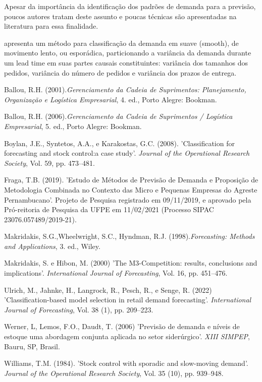 \documentclass[11pt,letterpaper,twocolumn]{article}
\begin{document}
Apesar da importância da identificação dos padrões de demanda para a previsão, poucos autores tratam deste assunto e poucas técnicas são apresentadas na literatura para essa finalidade.

\cite{Williams1984} apresenta um método para classificação da demanda em suave (smooth), de movimento lento, ou esporádica, particionando a variância da demanda durante um lead time em suas partes causais constituintes: variância dos tamanhos dos pedidos, variância do número de pedidos e variância dos prazos de entrega.

\begin{thebibliography}{9}

Ballou, R.H. (2001).{\it Gerenciamento da Cadeia de Suprimentos: Planejamento, Organização e Logística Empresarial}, 4. ed., Porto Alegre: Bookman.

Ballou, R.H. (2006).{\it Gerenciamento da Cadeia de Suprimentos / Logística Empresarial}, 5. ed., Porto Alegre: Bookman.

Boylan, J.E., Syntetos, A.A., e Karakostas, G.C. (2008). 'Classification for forecasting and stock control:a case study'. {\it Journal of the Operational Research Society}, Vol. 59, pp. 473--481.

Fraga, T.B. (2019). 'Estudo de Métodos de Previsão de Demanda e Proposição de Metodologia Combinada no Contexto das Micro e Pequenas
Empresas do Agreste Pernambucano'. Projeto de Pesquisa registrado em 09/11/2019, e aprovado pela Pró-reitoria de Pesquisa da UFPE em 11/02/2021 (Processo SIPAC 23076.057489/2019-21).

Makridakis, S.G.,Wheelwright, S.C., Hyndman, R.J. (1998).{\it Forecasting: Methods and Applications}, 3. ed., Wiley.

Makridakis, S. e Hibon, M. (2000) 'The M3-Competition: results, conclusions and implications'. {\it International Journal of Forecasting}, Vol. 16, pp. 451--476.

Ulrich, M., Jahnke, H., Langrock, R., Pesch, R., e Senge, R. (2022) 'Classification-based model selection in retail demand forecasting'. {\it International Journal of Forecasting}, Vol. 38 (1), pp. 209--223.

Werner, L, Lemos, F.O., Daudt, T. (2006) 'Previsão de demanda e níveis de estoque uma abordagem conjunta aplicada no setor siderúrgico'. {\it XIII SIMPEP}, Bauru, SP, Brasil.

Williams, T.M. (1984). 'Stock control with sporadic and slow-moving demand'. {\it Journal of the Operational Research Society}, Vol. 35 (10), pp. 939–948. 

\end{thebibliography} 
\end{document}
